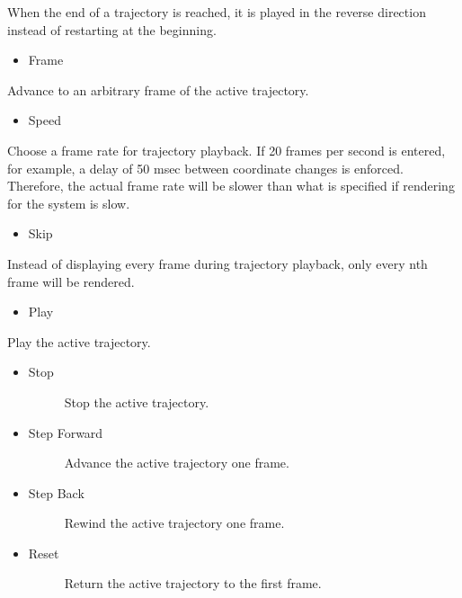 \documentclass[letterpaper,11pt,english]{sphinxmanual}
\begin{document}
When the end of a trajectory is reached, it is played in the reverse direction instead of restarting at the beginning.
\begin{itemize}
\item {} 
Frame

\end{itemize}

Advance to an arbitrary frame of the active trajectory.
\begin{itemize}
\item {} 
Speed

\end{itemize}

Choose a frame rate for trajectory playback. If 20 frames per second is entered, for example, a delay of 50 msec between coordinate changes is enforced. Therefore, the actual frame rate will be slower than what is specified if rendering for the system is slow.
\begin{itemize}
\item {} 
Skip

\end{itemize}

Instead of displaying every frame during trajectory playback, only every nth frame will be rendered.
\begin{itemize}
\item {} 
Play

\end{itemize}

Play the active trajectory.
\begin{itemize}
\item {} \begin{description}
\item[{Stop}] \leavevmode
Stop the active trajectory.

\end{description}

\item {} \begin{description}
\item[{Step Forward}] \leavevmode
Advance the active trajectory one frame.

\end{description}

\item {} \begin{description}
\item[{Step Back}] \leavevmode
Rewind the active trajectory one frame.

\end{description}

\item {} \begin{description}
\item[{Reset}] \leavevmode
Return the active trajectory to the first frame.

\end{description}

\end{itemize}
\end{document}
